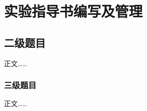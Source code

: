 
\chapter{实验指导书编写及管理}

\section{二级题目}
正文……\cite{yuFeiJiZongTiDuoXueKeSheJiYouHuaDeXianZhuangYuFaZhanFangXiang2008}

\subsection{三级题目}

正文……\cite{Hajela2012Application}

